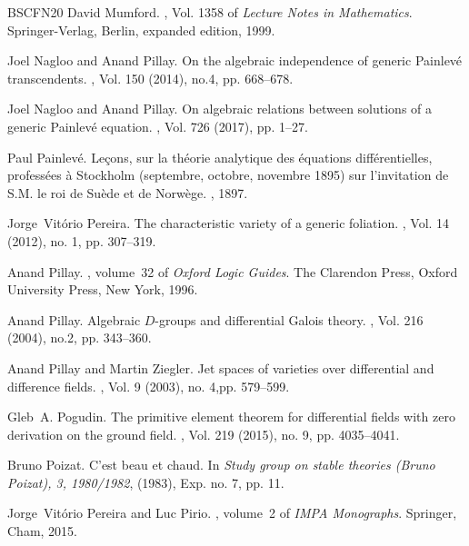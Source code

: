 \documentclass[12pt]{amsart}
\theoremstyle{definition}
\theoremstyle{plain}
\theoremstyle{exampstyle}
\theoremstyle{exampstyle}\newtheorem{thmxbis}{Theorem}
\numberwithin{equation}{section}
\theoremstyle{remark}
\begin{document}
\begin{thebibliography}{BSCFN20}
David Mumford.
, Vol. 1358 of {\em
  Lecture Notes in Mathematics}.
\newblock Springer-Verlag, Berlin, expanded edition, 1999.

Joel Nagloo and Anand Pillay.
\newblock On the algebraic independence of generic {P}ainlev\'{e}
  transcendents.
, Vol. 150 (2014), no.4, pp. 668--678.

Joel Nagloo and Anand Pillay.
\newblock On algebraic relations between solutions of a generic {P}ainlev\'{e}
  equation.
, Vol. 726 (2017), pp. 1--27.

Paul Painlev\'{e}.
\newblock Leçons, sur la théorie analytique des équations différentielles,
  professées à {S}tockholm (septembre, octobre, novembre 1895) sur
  l'invitation de S.M. le roi de {S}uède et de {N}orwège.
, 1897.

Jorge~Vit\'{o}rio Pereira.
\newblock The characteristic variety of a generic foliation.
, Vol. 14 (2012), no. 1, pp. 307--319.

Anand Pillay.
, volume~32 of {\em Oxford Logic
  Guides}.
\newblock The Clarendon Press, Oxford University Press, New York, 1996.

Anand Pillay.
\newblock Algebraic {$D$}-groups and differential {G}alois theory.
, Vol. 216 (2004), no.2, pp. 343--360.


Anand Pillay and Martin Ziegler.
\newblock Jet spaces of varieties over differential and difference fields.
, Vol. 9 (2003), no. 4,pp. 579--599.

Gleb~A. Pogudin.
\newblock The primitive element theorem for differential fields with zero
  derivation on the ground field.
, Vol. 219 (2015), no. 9, pp. 4035--4041.

Bruno Poizat.
\newblock C'est beau et chaud.
\newblock In {\em Study group on stable theories ({B}runo {P}oizat), 3,
  1980/1982}, (1983),  Exp. no. 7, pp. 11.

Jorge~Vit\'{o}rio Pereira and Luc Pirio.
, volume~2 of {\em IMPA
  Monographs}.
\newblock Springer, Cham, 2015.


\end{thebibliography}
\end{document}
